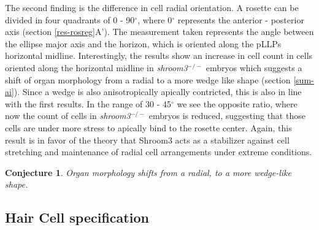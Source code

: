 \documentclass[11pt,singlespacinge,twoside]{reedthesis} %
\newtheorem{conjecture}{Conjecture}[chapter]
\theoremstyle{definition}
\theoremstyle{definition}
\theoremstyle{definition}
\theoremstyle{remark}
\begin{document}
The second finding is the difference in cell radial orientation. A rosette can be divided in four quadrants of 0 - 90\(^\circ\), where 0\(^\circ\) represents the anterior - posterior axis (section \ref{res-rosreg}A'). The measurement taken represents the angle between the ellipse major axis and the horizon, which is oriented along the pLLPs horizontal midline. Interestingly, the results show an increase in cell count in cells oriented along the horizontal midline in \emph{shroom3}\(^{-/-}\) embryos which suggests a shift of organ morphology from a radial to a more wedge like shape (section \ref{sum-ai}). Since a wedge is also anisotropically apically contricted, this is also in line with the first results. In the range of 30 - 45\(^\circ\) we see the opposite ratio, where now the count of cells in \emph{shroom3}\(^{-/-}\) embryos is reduced, suggesting that those cells are under more stress to apically bind to the rosette center. Again, this result is in favor of the theory that Shroom3 acts as a stabilizer against cell stretching and maintenance of radial cell arrangements under extreme conditions.
\begin{conjecture}
\protect\hypertarget{cnj:unnamed-chunk-16}{}{\label{cnj:unnamed-chunk-16} }Organ morphology shifts from a radial, to a more wedge-like shape.
\end{conjecture}
\hypertarget{hair-cell-specification}{%
\subsection{Hair Cell specification}\label{hair-cell-specification}}
\end{document}

